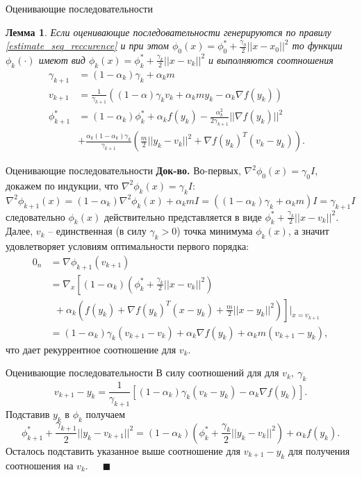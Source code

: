 \documentclass[10pt, handout]{beamer}
\newcounter{lm}
\newtheorem{lemma_ru}[lm]{Лемма}
\begin{document}
\begin{frame}{Оценивающие последовательности}
\begin{lemma_ru}
Если оценивающие последовательности генерируются по правилу \eqref{estimate_seq_reccurence} и при этом $\phi_0(x)=\phi_0^*+\frac{\gamma_0}{2}||x-x_0||^2$ то функции $\phi_k(\cdot)$ имеют вид $\phi_k(x)=\phi_k^*+\frac{\gamma_k}{2}||x-v_k||^2$ и выполняются соотношения
\begin{align}\label{quad_requrrences}
\gamma_{k+1}&=(1-\alpha_k)\gamma_k+\alpha_km&\nonumber\\
v_{k+1}&= \frac{1}{\gamma_{k+1}}((1-\alpha)\gamma_kv_k+\alpha_kmy_k-\alpha_k\nabla f(y_k))& \nonumber\\
\phi_{k+1}^*&=(1-\alpha_k)\phi_k^*+\alpha_kf(y_k)-\frac{\alpha_k^2}{2\gamma_{k+1}}||\nabla f(y_k)||^2&\nonumber\\
&+\frac{\alpha_k(1-\alpha_k)\gamma_k}{\gamma_{k+1}}
\left(\frac{m}{2}||y_k-v_k||^2+\nabla f(y_k)^T(v_k-y_k)\right).
\end{align}
\end{lemma_ru}
\end{frame}

\begin{frame}{Оценивающие последовательности}
\textbf{Док-во.} Во-первых, $\nabla^2\phi_0(x)=\gamma_0I$, докажем по индукции, что $\nabla^2\phi_k(x)=\gamma_kI$:
$$
\nabla^2\phi_{k+1}(x)=(1-\alpha_k)\nabla^2\phi_k(x)+
\alpha_kmI=((1-\alpha_k)\gamma_k+\alpha_km)I=\gamma_{k+1}I
$$
следовательно $\phi_k(x)$ действительно представляется в виде $\phi_k^*+\frac{\gamma_k}{2}||x-v_k||^2$.
\pause
\vspace{1em}\\
Далее, $v_k$ -- единственная (в силу $\gamma_k>0$) точка минимума $\phi_k(x)$, а значит удовлетворяет условиям оптимальности первого порядка:
\begin{align*}
0_n&=\nabla \phi_{k+1}(v_{k+1})\\&=\nabla_x\left[
(1-\alpha_k)\left(\phi_k^*+\frac{\gamma_k}{2}||x-v_k||^2\right)\right.\\&\left.~~+\alpha_k\left(f(y_k)+\nabla f(y_k)^T(x-y_k)+\frac{m}{2}||x-y_k||^2\right)\right]|_{x=v_{k+1}}\\
&=(1-\alpha_k)\gamma_k(v_{k+1}-v_k)+\alpha_k\nabla f(y_k)+\alpha_km(v_{k+1}-y_k),
\end{align*}
что дает рекуррентное соотношение для $v_k$.
\end{frame}

\begin{frame}{Оценивающие последовательности}
В силу соотношений для для $v_k,~\gamma_k$
$$
v_{k+1}-y_k=\frac{1}{\gamma_{k+1}}[(1-\alpha_k)\gamma_k(v_k-y_k)-\alpha_k\nabla f(y_k)].
$$
Подставив $y_k$ в $\phi_k$ получаем
$$
\phi_{k+1}^*+\frac{\gamma_{k+1}}{2}||y_k-v_{k+1}||^2=(1-\alpha_k)\left(\phi_k^*+\frac{\gamma_k}{2}||y_k-v_k||^2\right)+\alpha_kf(y_k).
$$
Осталось подставить указанное выше соотношение для $v_{k+1}-y_k$ для получения соотношения на $v_k$.~~~$\blacksquare$
\end{frame}
\end{document}
